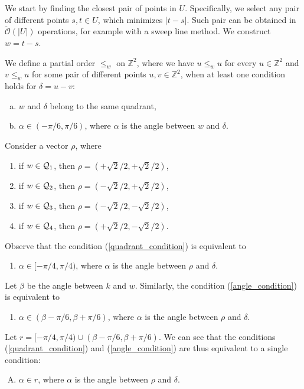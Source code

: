 \documentclass[11pt]{article}
\newcommand{\Z}{\mathbb{Z}}
\newcommand{\tO}{\tilde{\mathcal{O}}}
\theoremstyle{plain}
\theoremstyle{definition}
\theoremstyle{remark}
\begin{document}
\GetPeriods

We start by finding the closest pair of points in $U$.
Specifically, we select any pair of different points $s, t \in U$, which minimizes $|t - s|$. 
Such pair can be obtained in $\tO(|U|)$ operations, for example with a sweep line method.
We construct $w = t - s$.

We define a partial order $\le_{w}$ on $\Z^2$, where we have $u \le_w u$ for every $u \in \Z^2$ and $v \le_w u$ for some pair of different points $u, v \in \Z^2$, when at least one condition holds for $\delta = u - v$:
\begin{enumerate}[a)]
	\item $w$ and $\delta$ belong to the same quadrant, \label{quadrant_condition}
	\item $\alpha \in (-\pi / 6, \pi / 6)$, where $\alpha$ is the angle between $w$ and $\delta$. \label{angle_condition}
\end{enumerate}
Consider a vector $\rho$, where
\begin{enumerate}[$1^\circ$]
	\item if $w \in \mathcal{Q}_1$, then $\rho = (+\sqrt{2} / 2, +\sqrt{2} / 2)$,
	\item if $w \in \mathcal{Q}_2$, then $\rho = (-\sqrt{2} / 2, +\sqrt{2} / 2)$,
	\item if $w \in \mathcal{Q}_3$, then $\rho = (-\sqrt{2} / 2, -\sqrt{2} / 2)$,
	\item if $w \in \mathcal{Q}_4$, then $\rho = (+\sqrt{2} / 2, -\sqrt{2} / 2)$.
\end{enumerate}
Observe that the condition (\ref{quadrant_condition}) is equivalent to
\begin{enumerate}[a')]
	\item $\alpha \in [-\pi / 4, \pi / 4)$, where $\alpha$ is the angle between $\rho$ and $\delta$.
\end{enumerate}
Let $\beta$ be the angle between $k$ and $w$. Similarly, the condition (\ref{angle_condition}) is equivalent to
\begin{enumerate}[b')]
	\item $\alpha \in (\beta - \pi / 6, \beta + \pi / 6)$, where $\alpha$ is the angle between $\rho$ and $\delta$. 
\end{enumerate}
Let $r = [-\pi / 4, \pi / 4) \cup (\beta - \pi / 6, \beta + \pi / 6)$. 
We can see that the conditions (\ref{quadrant_condition}) and (\ref{angle_condition}) are thus equivalent to a single condition:
\begin{enumerate}[A)]
	\item $\alpha \in r$, where $\alpha$ is the angle between $\rho$ and $\delta$. \label{joint_condition}
\end{enumerate}
\end{document}
